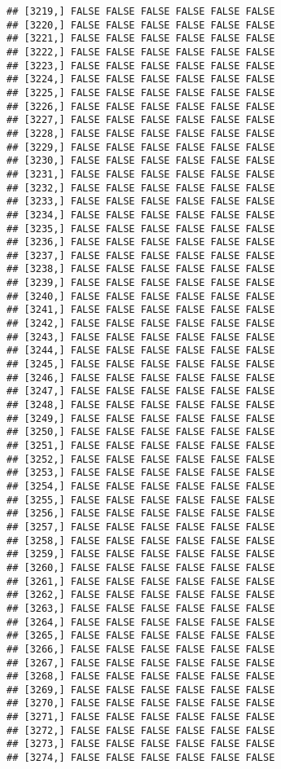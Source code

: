 \documentclass[
]{article}
\begin{document}
\begin{verbatim}
## [3219,] FALSE FALSE FALSE FALSE FALSE FALSE
## [3220,] FALSE FALSE FALSE FALSE FALSE FALSE
## [3221,] FALSE FALSE FALSE FALSE FALSE FALSE
## [3222,] FALSE FALSE FALSE FALSE FALSE FALSE
## [3223,] FALSE FALSE FALSE FALSE FALSE FALSE
## [3224,] FALSE FALSE FALSE FALSE FALSE FALSE
## [3225,] FALSE FALSE FALSE FALSE FALSE FALSE
## [3226,] FALSE FALSE FALSE FALSE FALSE FALSE
## [3227,] FALSE FALSE FALSE FALSE FALSE FALSE
## [3228,] FALSE FALSE FALSE FALSE FALSE FALSE
## [3229,] FALSE FALSE FALSE FALSE FALSE FALSE
## [3230,] FALSE FALSE FALSE FALSE FALSE FALSE
## [3231,] FALSE FALSE FALSE FALSE FALSE FALSE
## [3232,] FALSE FALSE FALSE FALSE FALSE FALSE
## [3233,] FALSE FALSE FALSE FALSE FALSE FALSE
## [3234,] FALSE FALSE FALSE FALSE FALSE FALSE
## [3235,] FALSE FALSE FALSE FALSE FALSE FALSE
## [3236,] FALSE FALSE FALSE FALSE FALSE FALSE
## [3237,] FALSE FALSE FALSE FALSE FALSE FALSE
## [3238,] FALSE FALSE FALSE FALSE FALSE FALSE
## [3239,] FALSE FALSE FALSE FALSE FALSE FALSE
## [3240,] FALSE FALSE FALSE FALSE FALSE FALSE
## [3241,] FALSE FALSE FALSE FALSE FALSE FALSE
## [3242,] FALSE FALSE FALSE FALSE FALSE FALSE
## [3243,] FALSE FALSE FALSE FALSE FALSE FALSE
## [3244,] FALSE FALSE FALSE FALSE FALSE FALSE
## [3245,] FALSE FALSE FALSE FALSE FALSE FALSE
## [3246,] FALSE FALSE FALSE FALSE FALSE FALSE
## [3247,] FALSE FALSE FALSE FALSE FALSE FALSE
## [3248,] FALSE FALSE FALSE FALSE FALSE FALSE
## [3249,] FALSE FALSE FALSE FALSE FALSE FALSE
## [3250,] FALSE FALSE FALSE FALSE FALSE FALSE
## [3251,] FALSE FALSE FALSE FALSE FALSE FALSE
## [3252,] FALSE FALSE FALSE FALSE FALSE FALSE
## [3253,] FALSE FALSE FALSE FALSE FALSE FALSE
## [3254,] FALSE FALSE FALSE FALSE FALSE FALSE
## [3255,] FALSE FALSE FALSE FALSE FALSE FALSE
## [3256,] FALSE FALSE FALSE FALSE FALSE FALSE
## [3257,] FALSE FALSE FALSE FALSE FALSE FALSE
## [3258,] FALSE FALSE FALSE FALSE FALSE FALSE
## [3259,] FALSE FALSE FALSE FALSE FALSE FALSE
## [3260,] FALSE FALSE FALSE FALSE FALSE FALSE
## [3261,] FALSE FALSE FALSE FALSE FALSE FALSE
## [3262,] FALSE FALSE FALSE FALSE FALSE FALSE
## [3263,] FALSE FALSE FALSE FALSE FALSE FALSE
## [3264,] FALSE FALSE FALSE FALSE FALSE FALSE
## [3265,] FALSE FALSE FALSE FALSE FALSE FALSE
## [3266,] FALSE FALSE FALSE FALSE FALSE FALSE
## [3267,] FALSE FALSE FALSE FALSE FALSE FALSE
## [3268,] FALSE FALSE FALSE FALSE FALSE FALSE
## [3269,] FALSE FALSE FALSE FALSE FALSE FALSE
## [3270,] FALSE FALSE FALSE FALSE FALSE FALSE
## [3271,] FALSE FALSE FALSE FALSE FALSE FALSE
## [3272,] FALSE FALSE FALSE FALSE FALSE FALSE
## [3273,] FALSE FALSE FALSE FALSE FALSE FALSE
## [3274,] FALSE FALSE FALSE FALSE FALSE FALSE

\end{verbatim}
\end{document}
